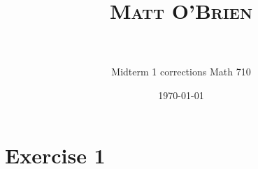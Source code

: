 \documentclass[paper=a4, fontsize=11pt]{scrartcl} %
\title{	
\normalfont \normalsize 
\textsc{Matt O'Brien} \\ [25pt] %
\horrule{0.5pt} \\[0.4cm] %
}
\author{Midterm 1 corrections Math 710}
\date{\normalsize\today} %
\begin{document}
\maketitle %



\section*{Exercise 1}
\begin{comment}
\textbf{Let X be a closed subset of [0,1] such that m(X) = 1.  Prove that X = [0, 1].}
\newline
\newline
Let $X$ be closed subset of $[0,1]$ such that $m(X) = 1$.  We need to show that $X= [0,1]$.  Let $a=inf(X)$ and let $b=sup(X)$.  Suppose, by contradiction, that $X \neq [0, 1]$.  Then, there a 3 cases for which $X=[0, 1]$.
\newline
Case 1:  $a > 0$.  By definition of measure, $m(X) = (b -a) - m([a, b]\backslash X) = 1$, but $(b - a) < 1$ and $m(X)$ cannot equal $1$.
\newline
Case 2:  $b > 1$.  Again, be definition of measure, we fnd that $(b - a) < 1$ and $m(X)$ cannot equal $1$.
\newline
Case 3:  $a = 0, and b = 0$, since $b - a = 1$, and since $X = [0, 1]$, then $[0, 1]\textbackslash X = 0$ which implies that $X$ must be equal to $[0, 1]$.
\end{comment}

\end{document}
